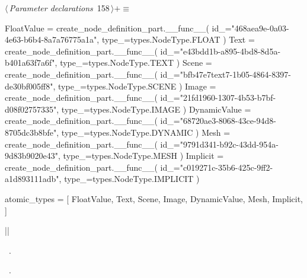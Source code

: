 \documentclass[%
    a4paper,    %
    justified,  %
    nobib,      %
    openany     %
]{tufte-book}
\begin{document}
\begin{flushleft} \small
\begin{minipage}{\linewidth}\label{scrap180}\raggedright\small
{} $\langle\,${\itshape Parameter declarations}\nobreak\ {\footnotesize {158}}$\,\rangle+\equiv$
\vspace{-1ex}
\begin{pythoncode}
    FloatValue = create_node_definition_part.__func__(
        id_="468aea9e-0a03-4e63-b6b4-8a7a76775a1a",
        type_=types.NodeType.FLOAT
    )
    Text = create_node_definition_part.__func__(
        id_="e43bdd1b-a895-4bd8-8d5a-b401a63f7a6f",
        type_=types.NodeType.TEXT
    )
    Scene = create_node_definition_part.__func__(
        id_="bfb47e7text7-1b05-4864-8397-de30bf005ff8",
        type_=types.NodeType.SCENE
    )
    Image = create_node_definition_part.__func__(
        id_="21fd1960-1307-4b53-b7bf-d08f02757335",
        type_=types.NodeType.IMAGE
    )
    DynamicValue = create_node_definition_part.__func__(
        id_="68720ae3-8068-43ce-94d8-8705dc3b8bfe",
        type_=types.NodeType.DYNAMIC
    )
    Mesh = create_node_definition_part.__func__(
        id_="9791d341-b92c-43dd-954a-9d83b9020e43",
        type_=types.NodeType.MESH
    )
    Implicit = create_node_definition_part.__func__(
        id_="c019271c-35b6-425c-9ff2-a1d893111adb",
        type_=types.NodeType.IMPLICIT
    )

    atomic_types = [
        FloatValue,
        Text,
        Scene,
        Image,
        DynamicValue,
        Mesh,
        Implicit,
    ]

|\NWsep|
\end{pythoncode}
\vspace{1.5ex}
\footnotesize
\begin{list}{}{\setlength{\itemsep}{-\parsep}\setlength{\itemindent}{-\leftmargin}}
\item \NWtxtMacroDefBy\ .
\item \NWtxtMacroRefIn\ .

\item{}
\end{list}
\end{minipage}\vspace{4ex}
\end{flushleft}
\end{document}
